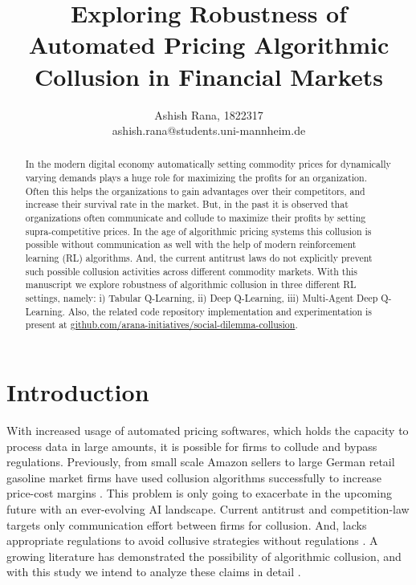 \documentclass{article}
\title{Exploring Robustness of Automated Pricing Algorithmic Collusion in Financial Markets}
\author{Ashish Rana, 1822317 \\
        ashish.rana@students.uni-mannheim.de}
\begin{document}
\maketitle
\tableofcontents %
\listoftables %
\newpage

\begin{abstract}

In the modern digital economy automatically setting commodity prices for dynamically varying demands plays a huge role for maximizing the profits for an organization.
Often this helps the organizations to gain advantages over their competitors, and increase their survival rate in the market.
But, in the past it is observed that organizations often communicate and collude to maximize their profits by setting supra-competitive prices.
In the age of algorithmic pricing systems this collusion is possible without communication as well with the help of modern reinforcement learning (RL) algorithms.
And, the current antitrust laws do not explicitly prevent such possible collusion activities across different commodity markets.
With this manuscript we explore robustness of algorithmic collusion in three different RL settings, namely: i) Tabular Q-Learning, ii) Deep Q-Learning, iii) Multi-Agent Deep Q-Learning.
Also, the related code repository implementation and experimentation is present at \href{https://github.com/arana-initiatives/social-dilemma-collusion}{github.com/arana-initiatives/social-dilemma-collusion}.

\end{abstract}

\section{Introduction}

With increased usage of automated pricing softwares, which holds the capacity to process data in large amounts, it is possible for firms to collude and bypass regulations.
Previously, from small scale Amazon sellers to large German retail gasoline market firms have used collusion algorithms successfully to increase price-cost margins \cite{assad2020algorithmic, kokkoris2020few}.
This problem is only going to exacerbate in the upcoming future with an ever-evolving AI landscape.
Current antitrust and competition-law targets only communication effort between firms for collusion.
And, lacks appropriate regulations to avoid collusive strategies without regulations \cite{calvano2020protecting}.
A growing literature has demonstrated the possibility of algorithmic collusion, and with this study we intend to analyze these claims in detail \cite{calvano2020artificial, klein2021autonomous}.
\end{document}
